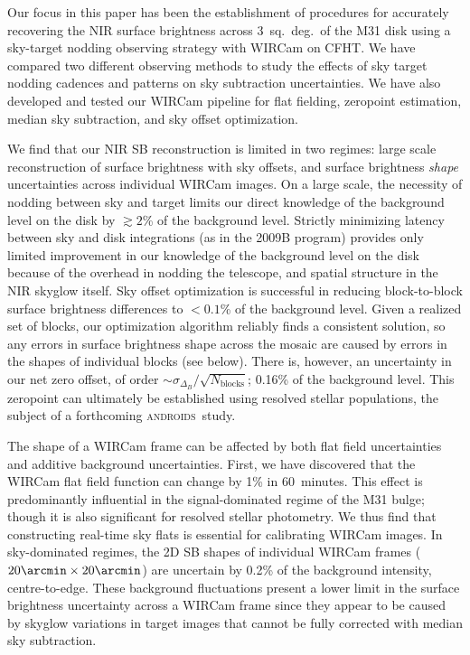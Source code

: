 \documentclass[iop]{emulateapj}
\newcommand{\androids}{\textsc{androids}}
\begin{document}
Our focus in this paper has been the establishment of procedures for accurately recovering the NIR surface brightness across 3~sq.~deg.\ of the M31 disk using a sky-target nodding observing strategy with WIRCam on CFHT\@.
We have compared two different observing methods to study the effects of sky target nodding cadences and patterns on sky subtraction uncertainties.
We have also developed and tested our WIRCam pipeline for flat fielding, zeropoint estimation, median sky subtraction, and sky offset optimization.

We find that our NIR SB reconstruction is limited in two regimes: large scale reconstruction of surface brightness with sky offsets, and surface brightness \emph{shape} uncertainties across individual WIRCam images.
On a large scale, the necessity of nodding between sky and target limits our direct knowledge of the background level on the disk by $\gtrsim 2$\% of the background level.
Strictly minimizing latency between sky and disk integrations (as in the 2009B program) provides only limited improvement in our knowledge of the background level on the disk because of the overhead in nodding the telescope, and spatial structure in the NIR skyglow itself.
Sky offset optimization is successful in reducing block-to-block surface brightness differences to $<0.1$\% of the background level.
Given a realized set of blocks, our optimization algorithm reliably finds a consistent solution, so any errors in surface brightness shape across the mosaic are caused by errors in the shapes of individual blocks (see below).
There is, however, an uncertainty in our net zero offset, of order $\sim \sigma_{\Delta_B} / \sqrt{N_\mathrm{blocks}}$; 0.16\% of the background level.
This zeropoint can ultimately be established using resolved stellar populations, the subject of a forthcoming \androids\ study.

The shape of a WIRCam frame can be affected by both flat field uncertainties and additive background uncertainties.
First, we have discovered that the WIRCam flat field function can change by 1\% in 60~minutes.
This effect is predominantly influential in the signal-dominated regime of the M31 bulge; though it is also significant for resolved stellar photometry.
We thus find that constructing real-time sky flats is essential for calibrating WIRCam images.
In sky-dominated regimes, the 2D SB shapes of individual WIRCam frames ($20\arcmin\times20\arcmin$) are uncertain by 0.2\% of the background intensity, centre-to-edge.
These background fluctuations present a lower limit in the surface brightness uncertainty across a WIRCam frame since they appear to be caused by skyglow variations in target images that cannot be fully corrected with median sky subtraction.
\end{document}
